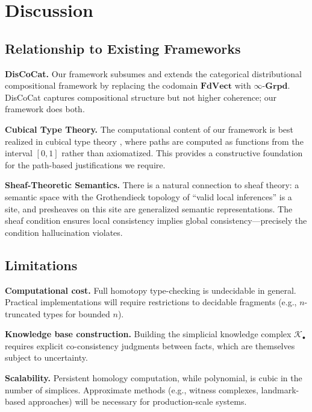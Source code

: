 \documentclass[11pt,a4paper,twocolumn]{article}
\theoremstyle{plain}
\theoremstyle{definition}
\newcommand{\Grpd}{\boldsymbol{\infty}\text{-}\mathbf{Grpd}}
\begin{document}
\section{Discussion}\label{sec:discussion}

\subsection{Relationship to Existing Frameworks}

\textbf{DisCoCat.} Our framework subsumes and extends the categorical distributional compositional framework \cite{coecke2010mathematical} by replacing the codomain $\mathbf{FdVect}$ with $\Grpd$. DisCoCat captures compositional structure but not higher coherence; our framework does both.

\textbf{Cubical Type Theory.} The computational content of our framework is best realized in cubical type theory \cite{cohen2018cubical}, where paths are computed as functions from the interval $[0,1]$ rather than axiomatized. This provides a constructive foundation for the path-based justifications we require.

\textbf{Sheaf-Theoretic Semantics.} There is a natural connection to sheaf theory: a semantic space with the Grothendieck topology of ``valid local inferences'' is a site, and presheaves on this site are generalized semantic representations. The sheaf condition ensures local consistency implies global consistency---precisely the condition hallucination violates.

\subsection{Limitations}

\textbf{Computational cost.} Full homotopy type-checking is undecidable in general. Practical implementations will require restrictions to decidable fragments (e.g., $n$-truncated types for bounded $n$).

\textbf{Knowledge base construction.} Building the simplicial knowledge complex $\mathcal{K}_\bullet$ requires explicit co-consistency judgments between facts, which are themselves subject to uncertainty.

\textbf{Scalability.} Persistent homology computation, while polynomial, is cubic in the number of simplices. Approximate methods (e.g., witness complexes, landmark-based approaches) will be necessary for production-scale systems.
\end{document}
